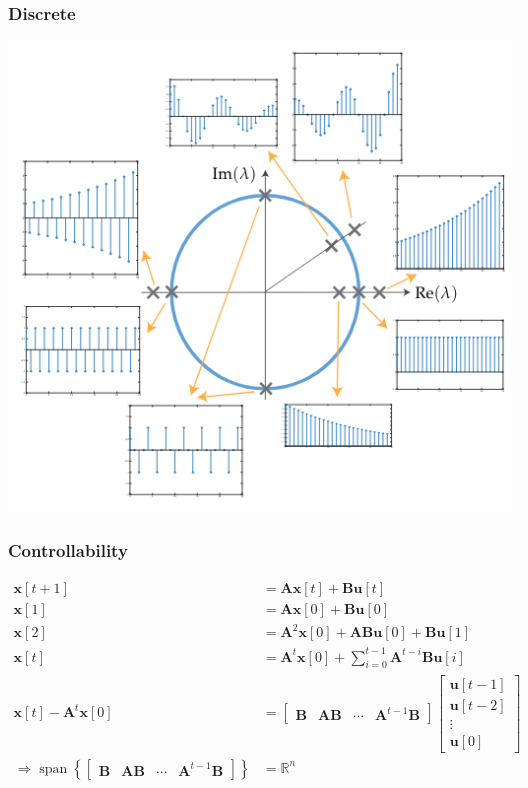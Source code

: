 \documentclass[aspectratio=169]{beamer}
\newcommand{\R}{\mathbb{R}}
\begin{document}
\begin{frame}
    \frametitle{Discrete}
    
    \centering
    \includegraphics[width=\textheight]{discrete.png}
\end{frame}

\begin{frame}
    \frametitle{Controllability}

    \begin{align}
        \bm{x}[t + 1] &= \bm{Ax}[t] + \bm{Bu}[t] \\
        \bm{x}[1] &= \bm{Ax}[0] + \bm{Bu}[0] \\
        \bm{x}[2] &= \bm{A}^2 \bm{x}[0] + \bm{ABu}[0] + \bm{Bu}[1] \\
        \bm{x}[t] &= \bm{A}^t \bm{x}[0] + \sum_{i = 0}^{t - 1} \bm{A}^{t - i} \bm{Bu}[i] \\
        \bm{x}[t] - \bm{A}^t \bm{x}[0] &=
        \begin{bmatrix}
            \bm{B} & \bm{AB} & \cdots & \bm{A}^{t - 1} \bm{B}
        \end{bmatrix}
        \begin{bmatrix}
            \bm{u}[t - 1] \\
            \bm{u}[t - 2] \\ 
            \vdots \\
            \bm{u}[0]
        \end{bmatrix} \\
        \Rightarrow \operatorname{span}\left\{
        \begin{bmatrix}
            \bm{B} & \bm{AB} & \cdots & \bm{A}^{t - 1} \bm{B}
        \end{bmatrix}\right\} &= \R^n
    \end{align}
\end{frame}
\end{document}
